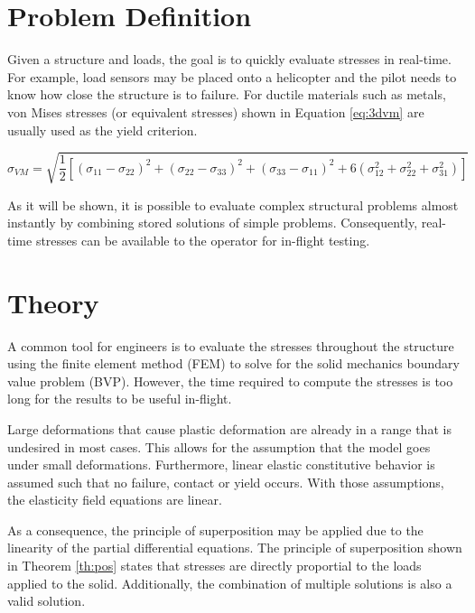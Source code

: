 \documentclass[letterpaper,12pt,]{article}
\begin{document}


\section*{Problem Definition}

Given a structure and loads, the goal is to quickly evaluate stresses in real-time. For example, load sensors may be placed onto a helicopter and the pilot needs to know how close the structure is to failure. For ductile materials such as metals, von Mises stresses (or equivalent stresses) shown in Equation \ref{eq:3dvm} are usually used as the yield criterion.

\begin{equation}
\sigma_{VM} = \sqrt{\frac{1}{2}[
               (\sigma_{11}-\sigma_{22})^{2}
              +(\sigma_{22}-\sigma_{33})^{2}
              +(\sigma_{33}-\sigma_{11})^{2}
              +6(\sigma_{12}^2+\sigma_{22}^2+\sigma_{31}^2)
              ]}
\label{eq:3dvm}
\end{equation}


As it will be shown, it is possible to evaluate complex structural problems almost instantly by combining stored solutions of simple problems. Consequently, real-time stresses can be available to the operator for in-flight testing.


\section*{Theory}

A common tool for engineers is to evaluate the stresses throughout the structure using the finite element method (FEM) to solve for the solid mechanics boundary value problem (BVP). However, the time required to compute the stresses is too long for the results to be useful in-flight.

Large deformations that cause plastic deformation are already in a range that is undesired in most cases. This allows for the assumption that the model goes under small deformations. Furthermore, linear elastic constitutive behavior is assumed such that no failure, contact or yield occurs. With those assumptions, the elasticity field equations are linear.

As a consequence, the principle of superposition may be applied due to the linearity of the partial differential equations. The principle of superposition shown in Theorem \ref{th:pos} states that stresses are directly proportial to the loads applied to the solid. Additionally, the combination of multiple solutions is also a valid solution.
\end{document}
